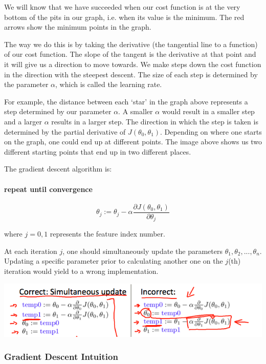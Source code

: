 \documentclass[UTF8]{article}
\begin{document}
We will know that we have succeeded when our cost function is at the very bottom of the pits in our graph, i.e. when its value is the minimum. The red arrows show the minimum points in the graph.

The way we do this is by taking the derivative (the tangential line to a function) of our cost function. The slope of the tangent is the derivative at that point and it will give us a direction to move towards. We make steps down the cost function in the direction with the steepest descent. The size of each step is determined by the parameter $\alpha$, which is called the learning rate.

For example, the distance between each `star' in the graph above represents a step determined by our parameter $\alpha$. A smaller $\alpha$ would result in a smaller step and a larger $\alpha$ results in a larger step. The direction in which the step is taken is determined by the partial derivative of $J(\theta_0,\theta_1)$. Depending on where one starts on the graph, one could end up at different points. The image above shows us two different starting points that end up in two different places.

The gradient descent algorithm is:

\paragraph{repeat until convergence}

\[ \theta_j:=\theta_j - \alpha\frac{\partial J(\theta_0,\theta_1)}{\partial \theta_j} \]

where $j=0,1$ represents the feature index number.

At each iteration $j$, one should simultaneously update the parameters $\theta_1,\theta_2,...,\theta_n$. Updating a specific parameter prior to calculating another one on the $j$(th) iteration would yield to a wrong implementation.

\includegraphics[width = .8\textwidth]{NotePics/2_3_2.png}

\subsubsection{Gradient Descent Intuition}
\end{document}
